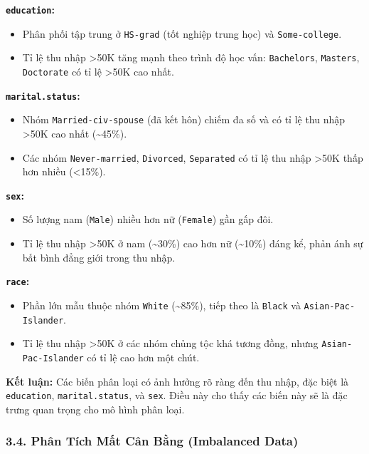 \documentclass[
]{article}
\providecommand{\tightlist}{%
  \setlength{\itemsep}{0pt}\setlength{\parskip}{0pt}}
\begin{document}
\textbf{\texttt{education}:}

\begin{itemize}
\tightlist
\item
  Phân phối tập trung ở \texttt{HS-grad} (tốt nghiệp trung học) và
  \texttt{Some-college}.
\item
  Tỉ lệ thu nhập \textgreater50K tăng mạnh theo trình độ học vấn:
  \texttt{Bachelors}, \texttt{Masters}, \texttt{Doctorate} có tỉ lệ
  \textgreater50K cao nhất.
\end{itemize}

\textbf{\texttt{marital.status}:}

\begin{itemize}
\tightlist
\item
  Nhóm \texttt{Married-civ-spouse} (đã kết hôn) chiếm đa số và có tỉ lệ
  thu nhập \textgreater50K cao nhất (\textasciitilde45\%).
\item
  Các nhóm \texttt{Never-married}, \texttt{Divorced}, \texttt{Separated}
  có tỉ lệ thu nhập \textgreater50K thấp hơn nhiều (\textless15\%).
\end{itemize}

\textbf{\texttt{sex}:}

\begin{itemize}
\tightlist
\item
  Số lượng nam (\texttt{Male}) nhiều hơn nữ (\texttt{Female}) gần gấp
  đôi.
\item
  Tỉ lệ thu nhập \textgreater50K ở nam (\textasciitilde30\%) cao hơn nữ
  (\textasciitilde10\%) đáng kể, phản ánh sự bất bình đẳng giới trong
  thu nhập.
\end{itemize}

\textbf{\texttt{race}:}

\begin{itemize}
\tightlist
\item
  Phần lớn mẫu thuộc nhóm \texttt{White} (\textasciitilde85\%), tiếp
  theo là \texttt{Black} và \texttt{Asian-Pac-Islander}.
\item
  Tỉ lệ thu nhập \textgreater50K ở các nhóm chủng tộc khá tương đồng,
  nhưng \texttt{Asian-Pac-Islander} có tỉ lệ cao hơn một chút.
\end{itemize}

\textbf{Kết luận:} Các biến phân loại có ảnh hưởng rõ ràng đến thu nhập,
đặc biệt là \texttt{education}, \texttt{marital.status}, và
\texttt{sex}. Điều này cho thấy các biến này sẽ là đặc trưng quan trọng
cho mô hình phân loại.

\subsubsection{3.4. Phân Tích Mất Cân Bằng (Imbalanced
Data)}\label{34-phuxe2n-tuxedch-mux1ea5t-cuxe2n-bux1eb1ng-imbalanced-data}
\end{document}
